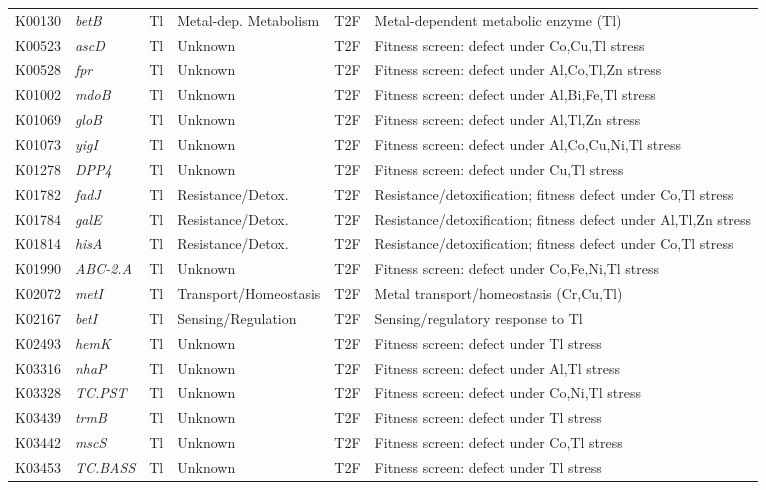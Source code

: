 \documentclass[11pt]{article}
\begin{document}
\begin{longtable}{lllllp{4.8cm}}
K00130 & \textit{betB} & Tl & Metal-dep. Metabolism & T2F & Metal-dependent metabolic enzyme (Tl) \\
K00523 & \textit{ascD} & Tl & Unknown & T2F & Fitness screen: defect under Co,Cu,Tl stress \\
K00528 & \textit{fpr} & Tl & Unknown & T2F & Fitness screen: defect under Al,Co,Tl,Zn stress \\
K01002 & \textit{mdoB} & Tl & Unknown & T2F & Fitness screen: defect under Al,Bi,Fe,Tl stress \\
K01069 & \textit{gloB} & Tl & Unknown & T2F & Fitness screen: defect under Al,Tl,Zn stress \\
K01073 & \textit{yigI} & Tl & Unknown & T2F & Fitness screen: defect under Al,Co,Cu,Ni,Tl stress \\
K01278 & \textit{DPP4} & Tl & Unknown & T2F & Fitness screen: defect under Cu,Tl stress \\
K01782 & \textit{fadJ} & Tl & Resistance/Detox. & T2F & Resistance/detoxification; fitness defect under Co,Tl stress \\
K01784 & \textit{galE} & Tl & Resistance/Detox. & T2F & Resistance/detoxification; fitness defect under Al,Tl,Zn stress \\
K01814 & \textit{hisA} & Tl & Resistance/Detox. & T2F & Resistance/detoxification; fitness defect under Co,Tl stress \\
K01990 & \textit{ABC-2.A} & Tl & Unknown & T2F & Fitness screen: defect under Co,Fe,Ni,Tl stress \\
K02072 & \textit{metI} & Tl & Transport/Homeostasis & T2F & Metal transport/homeostasis (Cr,Cu,Tl) \\
K02167 & \textit{betI} & Tl & Sensing/Regulation & T2F & Sensing/regulatory response to Tl \\
K02493 & \textit{hemK} & Tl & Unknown & T2F & Fitness screen: defect under Tl stress \\
K03316 & \textit{nhaP} & Tl & Unknown & T2F & Fitness screen: defect under Al,Tl stress \\
K03328 & \textit{TC.PST} & Tl & Unknown & T2F & Fitness screen: defect under Co,Ni,Tl stress \\
K03439 & \textit{trmB} & Tl & Unknown & T2F & Fitness screen: defect under Tl stress \\
K03442 & \textit{mscS} & Tl & Unknown & T2F & Fitness screen: defect under Co,Tl stress \\
K03453 & \textit{TC.BASS} & Tl & Unknown & T2F & Fitness screen: defect under Tl stress \\

\end{longtable}
\end{document}
